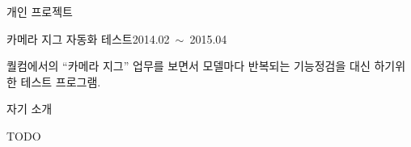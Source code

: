 \documentclass{resume} %
\begin{document}
\begin{rSection}{개인 프로젝트}
  \begin{rSubsection}{카메라 지그 자동화 테스트}{2014.02~$\sim$~2015.04}{}{}
  \item \small{
      퀄컴에서의 ``카메라 지그'' 업무를 보면서 모델마다 반복되는 기능정검을 대신 하기위한 테스트 프로그램.}
  \end{rSubsection}

\end{rSection}


\pagebreak


\begin{rSection}{자기 소개}

TODO

\end{rSection}
\end{document}
